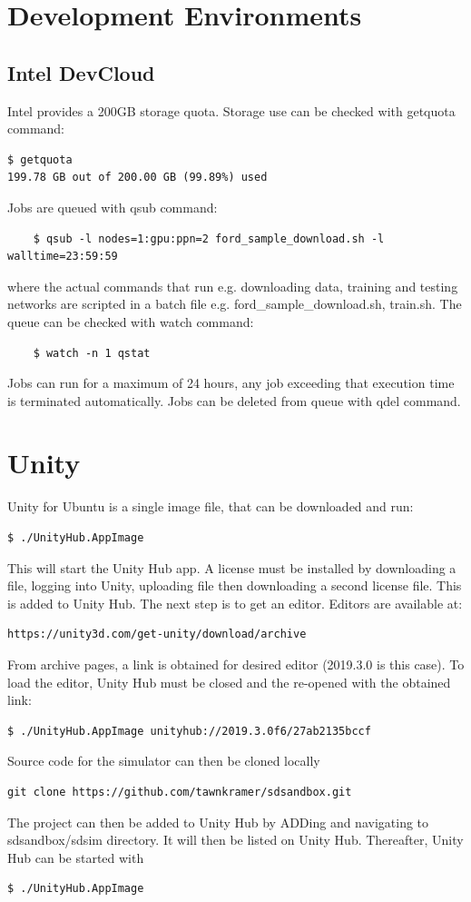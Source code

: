\section{Development Environments}

\subsection{Intel DevCloud}

Intel provides a 200GB storage quota. Storage use can be checked with getquota command:
\begin{verbatim}
$ getquota
199.78 GB out of 200.00 GB (99.89%) used   
\end{verbatim}
Jobs are queued with qsub command:
\begin{verbatim}
    $ qsub -l nodes=1:gpu:ppn=2 ford_sample_download.sh -l walltime=23:59:59
\end{verbatim}
where the actual commands that run e.g. downloading data, training and testing networks are scripted in a batch file e.g. ford\_sample\_download.sh, train.sh.   
The queue can be checked with watch command:
\begin{verbatim}
    $ watch -n 1 qstat
\end{verbatim}
Jobs can run for a maximum of 24 hours, any job exceeding that execution time is terminated automatically. Jobs can be deleted from queue with qdel command.

\section{Unity}
Unity for Ubuntu is a single image file, that can be downloaded and run:
\begin{verbatim}
$ ./UnityHub.AppImage    
\end{verbatim}
This will start the Unity Hub app. A license must be installed by downloading a file, logging into Unity, uploading file then downloading a second license file. This is added to Unity Hub. The next step is to get an editor. Editors are available at:
\begin{verbatim}
https://unity3d.com/get-unity/download/archive    
\end{verbatim}
From archive pages, a link is obtained for desired editor (2019.3.0 is this case).
To load the editor, Unity Hub must be closed and the re-opened with the obtained link:
\begin{verbatim}
$ ./UnityHub.AppImage unityhub://2019.3.0f6/27ab2135bccf
\end{verbatim}
Source code for the simulator can then be cloned locally
\begin{verbatim}
git clone https://github.com/tawnkramer/sdsandbox.git    
\end{verbatim}
The project can then be added to Unity Hub by ADDing and navigating to sdsandbox/sdsim directory. It will then be listed on Unity Hub. Thereafter, Unity Hub can be started with
\begin{verbatim}
$ ./UnityHub.AppImage    
\end{verbatim}

